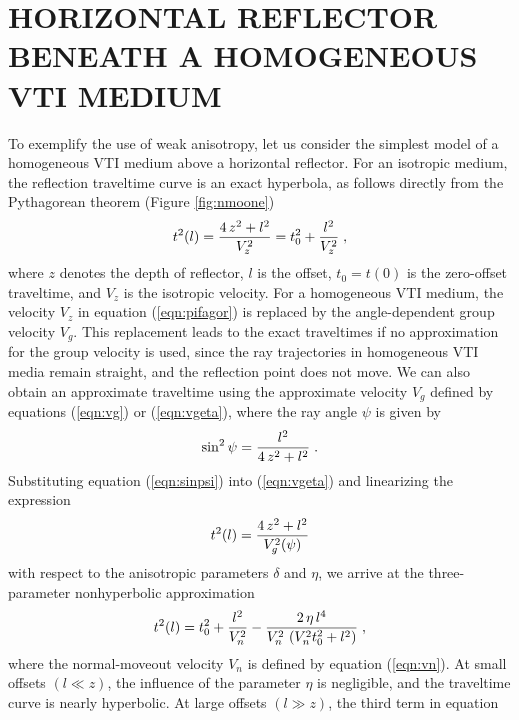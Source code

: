 
\section{HORIZONTAL REFLECTOR BENEATH A HOMOGENEOUS VTI MEDIUM}


To exemplify the use of weak anisotropy, let us consider the
simplest model of a homogeneous VTI medium above a horizontal
reflector. For an isotropic medium, the reflection traveltime curve is
an exact hyperbola, as follows directly from the Pythagorean theorem
(Figure \ref{fig:nmoone})
\begin{equation}
t^2(l) = {{4\,z^2 + l^2} \over V_z^2} = t_0^2 + {l^2 \over V_z^2}\;,
\label{eqn:pifagor}
\end{equation}
where $z$ denotes the depth of reflector, $l$ is the offset,
$t_0=t(0)$ is the zero-offset traveltime, and $V_z$ is the
isotropic velocity. For a homogeneous VTI medium, the
velocity $V_z$ in equation (\ref{eqn:pifagor}) is replaced by the
angle-dependent group velocity $V_g$. This replacement leads to the
exact traveltimes if no approximation for the group velocity is used,
since the ray trajectories in homogeneous VTI media remain straight,
and the reflection point does not move. 
We can also obtain an approximate traveltime using the
approximate velocity $V_g$ defined by equations (\ref{eqn:vg}) or
(\ref{eqn:vgeta}), where the ray angle $\psi$ is given by 
\begin{equation}
\sin^2{\psi} = {{l^2} \over {4\,z^2 + l^2}}\;.
\label{eqn:sinpsi}
\end{equation}
Substituting equation (\ref{eqn:sinpsi}) into (\ref{eqn:vgeta}) and
linearizing the expression
\begin{equation}
  t^2(l) = {{4\,z^2 + l^2} \over V_g^2(\psi)}
\label{eqn:TIpifagor}
\end{equation}
with respect to the anisotropic parameters $\delta$ and $\eta$, we arrive
at the three-parameter nonhyperbolic approximation \cite[]{tsvantom}
\begin{equation}
t^2(l) = t_0^2 + {l^2 \over V_n^2} - {{2\,\eta\,l^4} \over 
{V_n^2\,\left(V_n^2 t_0^2 + l^2\right)}}\;,
\label{eqn:TIapprox}
\end{equation}
where the normal-moveout velocity $V_n$ is defined by equation
(\ref{eqn:vn}).  At small offsets $(l \ll z)$, the influence of the
parameter $\eta$ is negligible, and the traveltime curve is nearly
hyperbolic. At large offsets $(l \gg z)$, the third term in equation
